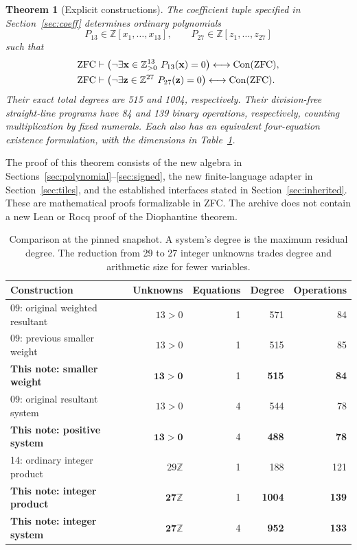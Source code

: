 \documentclass[11pt]{article}
\newtheorem{theorem}{Theorem}[section]
\theoremstyle{definition}\newtheorem{definition}[theorem]{Definition}
\theoremstyle{remark}\newtheorem{remark}[theorem]{Remark}
\newcommand{\Z}{\mathbb Z}\newcommand{\N}{\mathbb N}
\begin{document}
\begin{theorem}[Explicit constructions]
\label{thm:main}
The coefficient tuple specified in Section~\ref{sec:coeff} determines ordinary polynomials
\[
P_{13}\in\Z[x_1,\ldots,x_{13}],\qquad
P_{27}\in\Z[z_1,\ldots,z_{27}]
\]
such that
\begin{align}
\mathrm{ZFC}&\vdash
 \bigl(\neg\exists\mathbf x\in\Z_{>0}^{13}\ P_{13}(\mathbf x)=0\bigr)
 \longleftrightarrow\Con(\mathrm{ZFC}),\label{eq:theorem13}\\
\mathrm{ZFC}&\vdash
 \bigl(\neg\exists\mathbf z\in\Z^{27}\ P_{27}(\mathbf z)=0\bigr)
 \longleftrightarrow\Con(\mathrm{ZFC}).\label{eq:theorem27}
\end{align}
Their exact total degrees are 515 and 1004, respectively. Their division-free straight-line programs have 84 and 139 binary operations, respectively, counting multiplication by fixed numerals. Each also has an equivalent four-equation existence formulation, with the dimensions in Table~\ref{tab:frontier}.
\end{theorem}

The proof of this theorem consists of the new algebra in Sections~\ref{sec:polynomial}--\ref{sec:signed}, the new finite-language adapter in Section~\ref{sec:tiles}, and the established interfaces stated in Section~\ref{sec:inherited}. These are mathematical proofs formalizable in ZFC. The archive does not contain a new Lean or Rocq proof of the Diophantine theorem.

\begin{table}[ht]
\centering\small
\begin{tabular}{@{}lrrrr@{}}
\toprule
Construction & Unknowns & Equations & Degree & Operations\\
\midrule
09: original weighted resultant & $13>0$ & 1 & 571 & 84\\
09: previous smaller weight & $13>0$ & 1 & 515 & 85\\
\textbf{This note: smaller weight} & $\mathbf{13>0}$ & 1 & \textbf{515} & \textbf{84}\\
09: original resultant system & $13>0$ & 4 & 544 & 78\\
\textbf{This note: positive system} & $\mathbf{13>0}$ & 4 & \textbf{488} & \textbf{78}\\
14: ordinary integer product & $29\Z$ & 1 & 188 & 121\\
\textbf{This note: integer product} & $\mathbf{27\Z}$ & 1 & \textbf{1004} & \textbf{139}\\
\textbf{This note: integer system} & $\mathbf{27\Z}$ & 4 & \textbf{952} & \textbf{133}\\
\bottomrule
\end{tabular}
\caption{Comparison at the pinned snapshot. A system's degree is the maximum residual degree. The reduction from 29 to 27 integer unknowns trades degree and arithmetic size for fewer variables.}
\label{tab:frontier}
\end{table}
\end{document}

